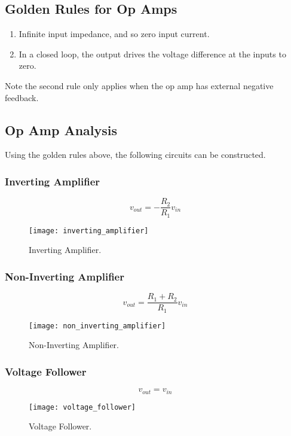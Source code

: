 \documentclass{article}
\begin{document}
\subsection{Golden Rules for Op Amps}
\begin{enumerate}
    \item Infinite input impedance, and so zero input current.
    \item In a closed loop, the output drives the voltage difference at the inputs to zero.
\end{enumerate}
Note the second rule only applies when the op amp has external negative feedback.
\subsection{Op Amp Analysis}
Using the golden rules above, the following circuits can be constructed. 
\subsubsection{Inverting Amplifier}
\begin{equation*}
    v_{out} = -\frac{R_2}{R_1}v_{in}
\end{equation*}
\begin{figure}[H]
    \centering
    \texttt{[image: inverting\_amplifier]}
    \caption{Inverting Amplifier.}
\end{figure}
\subsubsection{Non-Inverting Amplifier}
\begin{equation*}
    v_{out} = \frac{R_1 + R_2}{R_1}v_{in}
\end{equation*}
\begin{figure}[H]
    \centering
    \texttt{[image: non\_inverting\_amplifier]}
    \caption{Non-Inverting Amplifier.}
\end{figure}
\subsubsection{Voltage Follower}
\begin{equation*}
    v_{out} = v_{in}
\end{equation*}
\begin{figure}[H]
    \centering
    \texttt{[image: voltage\_follower]}
    \caption{Voltage Follower.}
\end{figure}
\end{document}
